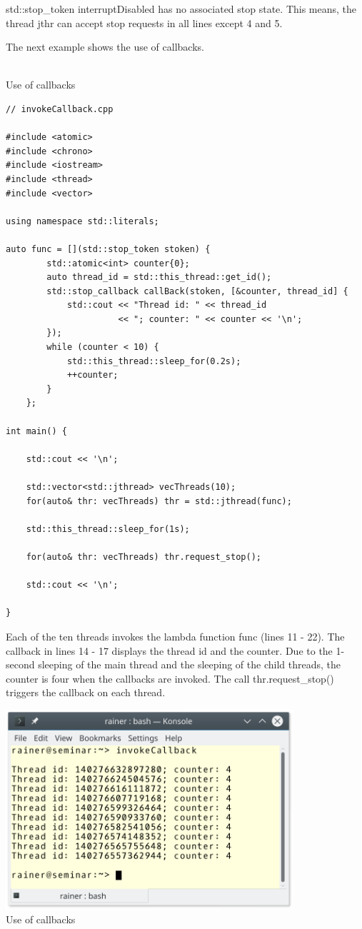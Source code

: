 std::stop\_token interruptDisabled has no associated stop state. This means, the thread jthr can accept stop requests in all lines except 4 and 5.

The next example shows the use of callbacks.

\hspace*{\fill} \\ %
\noindent
Use of callbacks
\begin{lstlisting}[style=styleCXX]
// invokeCallback.cpp

#include <atomic>
#include <chrono>
#include <iostream>
#include <thread>
#include <vector>

using namespace std::literals;

auto func = [](std::stop_token stoken) {
		std::atomic<int> counter{0};
		auto thread_id = std::this_thread::get_id();
		std::stop_callback callBack(stoken, [&counter, thread_id] {
			std::cout << "Thread id: " << thread_id
					  << "; counter: " << counter << '\n';
		});
		while (counter < 10) {
			std::this_thread::sleep_for(0.2s);
			++counter;
		}
	};

int main() {

	std::cout << '\n';
	
	std::vector<std::jthread> vecThreads(10);
	for(auto& thr: vecThreads) thr = std::jthread(func);
	
	std::this_thread::sleep_for(1s);
	
	for(auto& thr: vecThreads) thr.request_stop();
	
	std::cout << '\n';

}
\end{lstlisting}

Each of the ten threads invokes the lambda function func (lines 11 - 22). The callback in lines 14 - 17 displays the thread id and the counter. Due to the 1-second sleeping of the main thread and the sleeping of the child threads, the counter is four when the callbacks are invoked. The call thr.request\_stop() triggers the callback on each thread.

\begin{center}
\includegraphics[width=0.8\textwidth]{content/3/chapter6/images/23.png}\\
Use of callbacks
\end{center}


